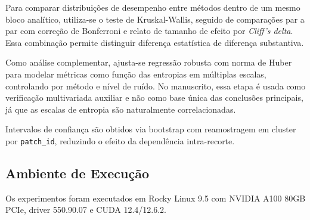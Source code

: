 Para comparar distribuições de desempenho entre métodos dentro de um mesmo bloco analítico, utiliza-se o teste de Kruskal-Wallis, seguido de comparações par a par com correção de Bonferroni e relato de tamanho de efeito por \emph{Cliff's delta}.
Essa combinação permite distinguir diferença estatística de diferença substantiva.

Como análise complementar, ajusta-se regressão robusta com norma de Huber para modelar métricas como função das entropias em múltiplas escalas, controlando por método e nível de ruído.
No manuscrito, essa etapa é usada como verificação multivariada auxiliar e não como base única das conclusões principais, já que as escalas de entropia são naturalmente correlacionadas.

Intervalos de confiança são obtidos via bootstrap com reamostragem em cluster por \texttt{patch\_id}, reduzindo o efeito da dependência intra-recorte.

\subsection{Ambiente de Execução}
Os experimentos foram executados em Rocky Linux 9.5 com NVIDIA A100 80GB PCIe,
driver 550.90.07 e CUDA 12.4/12.6.2.
